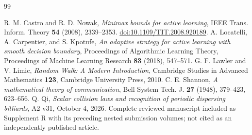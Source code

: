 \begin{thebibliography}{99}
\raggedright
{}
R. M. Castro and R. D. Nowak, \emph{Minimax bounds for active learning},
IEEE Trans. Inform. Theory \textbf{54} (2008), 2339--2353.
\href{https://doi.org/10.1109/TIT.2008.920189}{doi:10.1109/TIT.2008.920189}.
A. Locatelli, A. Carpentier, and S. Kpotufe,
\emph{An adaptive strategy for active learning with smooth decision boundary},
Proceedings of Algorithmic Learning Theory, Proceedings of Machine
Learning Research \textbf{83} (2018), 547--571.
G. F. Lawler and V. Limic, \emph{Random Walk: A Modern Introduction},
Cambridge Studies in Advanced Mathematics \textbf{123}, Cambridge
University Press, 2010.
C. E. Shannon, \emph{A mathematical theory of communication},
Bell System Tech. J. \textbf{27} (1948), 379--423, 623--656.
Q. Qi, \emph{Scalar collision laws and recognition of periodic dispersing
billiards}, A2 v31, October 4, 2026. Complete reviewed manuscript included
as Supplement R with its preceding nested submission volumes; not cited
as an independently published article.
\end{thebibliography}
